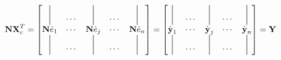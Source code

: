 \begin{notechapter}
\begin{align*}
    \textbf{N}\textbf{X}_c^T =
    \begin{bmatrix*}
        \vertbar & \cdots & \vertbar & \cdots & \vertbar\\
        \textbf{N}\dot{e}_{1} & \cdots & \textbf{N}\dot{e}_{j} & \cdots & \textbf{N}\dot{e}_{n}\\
        \vertbar & \cdots & \vertbar & \cdots & \vertbar
    \end{bmatrix*}
    =
    \begin{bmatrix*}
        \vertbar & \cdots & \vertbar & \cdots & \vertbar\\
        \dot{\textbf{y}}_{1} & \cdots & \dot{\textbf{y}}_{j} & \cdots & \dot{\textbf{y}}_{n}\\
        \vertbar & \cdots & \vertbar & \cdots & \vertbar
    \end{bmatrix*}
    = \textbf{Y}
\end{align*}


\end{notechapter}
